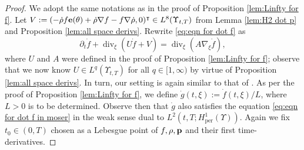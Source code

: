 \documentclass[11pt,a4paper,reqno]{amsart}
\theoremstyle{remark}
\theoremstyle{definition}
\numberwithin{equation}{section}
\newcommand{\per}{\mathrm{per}}
\DeclareMathOperator{\dv}{div}
\newcommand{\p}{{\bf p}}
\newcommand{\e}{{\bf e}}
\newcommand{\bxi}{\xi}
\begin{document}
\begin{proof}
    We adopt the same notations as in the proof of Proposition \ref{lem:Linfty for f}. Let $V:=(-\dot{\rho} f \e(\theta) + \dot{\rho} \nabla f - f \nabla \dot{\rho},0)^\intercal  \in L^8(\Upsilon_{t,T})$ from Lemma \ref{lem:H2 dot p} and Proposition \ref{lem:all space derivs}. Rewrite \eqref{eq:eqn for dot f} as 
    \begin{equation}\label{eq:eqn for dot f in moser}
        \partial_t \dot{f} + \dv_{\bxi}(U \dot{f} + V) = \dv_{\bxi}(A \nabla_{\bxi}\dot{f}), 
    \end{equation}
    where $U$ and $A$ were defined in the proof of Proposition \ref{lem:Linfty for f}; observe that we now know $U \in L^q(\Upsilon_{t,T})$ for all $q \in [1,\infty)$ by virtue of Proposition \ref{lem:all space derivs}. In turn, our setting is again similar to that of \cite[\S 3.2]{reg1}. As per the proof of Proposition \ref{lem:Linfty for f}, we define $\dot{g}(t,\bxi) := \dot{f}(t,\bxi)/{L}$, where $L>0$ is to be determined. Observe then that $\dot{g}$ also satisfies the equation \eqref{eq:eqn for dot f in moser} in the weak sense dual to $L^2(t,T;H^1_\per(\Upsilon))$. Again we fix $t_0 \in (0,T)$ chosen as a Lebesgue point of $f,\rho,\p$ and their first time-derivatives. 




\end{proof}
\end{document}

